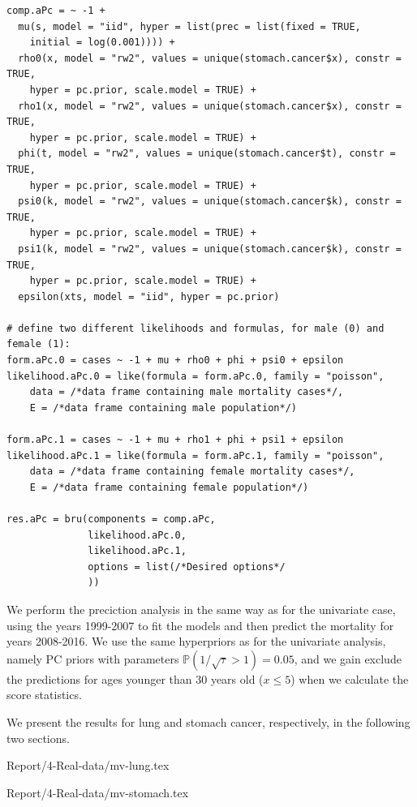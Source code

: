 \begin{verbatim}
comp.aPc = ~ -1 + 
  mu(s, model = "iid", hyper = list(prec = list(fixed = TRUE,
    initial = log(0.001)))) +
  rho0(x, model = "rw2", values = unique(stomach.cancer$x), constr = TRUE,
    hyper = pc.prior, scale.model = TRUE) + 
  rho1(x, model = "rw2", values = unique(stomach.cancer$x), constr = TRUE,
    hyper = pc.prior, scale.model = TRUE) + 
  phi(t, model = "rw2", values = unique(stomach.cancer$t), constr = TRUE,
    hyper = pc.prior, scale.model = TRUE) + 
  psi0(k, model = "rw2", values = unique(stomach.cancer$k), constr = TRUE,
    hyper = pc.prior, scale.model = TRUE) + 
  psi1(k, model = "rw2", values = unique(stomach.cancer$k), constr = TRUE,
    hyper = pc.prior, scale.model = TRUE) + 
  epsilon(xts, model = "iid", hyper = pc.prior)

# define two different likelihoods and formulas, for male (0) and female (1):
form.aPc.0 = cases ~ -1 + mu + rho0 + phi + psi0 + epsilon
likelihood.aPc.0 = like(formula = form.aPc.0, family = "poisson",
    data = /*data frame containing male mortality cases*/,
    E = /*data frame containing male population*/)

form.aPc.1 = cases ~ -1 + mu + rho1 + phi + psi1 + epsilon
likelihood.aPc.1 = like(formula = form.aPc.1, family = "poisson",
    data = /*data frame containing female mortality cases*/,
    E = /*data frame containing female population*/)

res.aPc = bru(components = comp.aPc,
              likelihood.aPc.0,
              likelihood.aPc.1,
              options = list(/*Desired options*/
              )) 
\end{verbatim}
\newpar We perform the preciction analysis in the same way as for the univariate case, using the years 1999-2007 to fit the models and then predict the mortality for years 2008-2016. We use the same hyperpriors as for the univariate analysis, namely PC priors with parameters $\mathbb{P}(1/\sqrt{\tau} > 1) = 0.05$, and we gain exclude the predictions for ages younger than 30 years old ($x \leq 5$) when we calculate the score statistics.

We present the results for lung and stomach cancer, respectively, in the following two sections.

{Report/4-Real-data/mv-lung.tex}

{Report/4-Real-data/mv-stomach.tex}

\newpage
